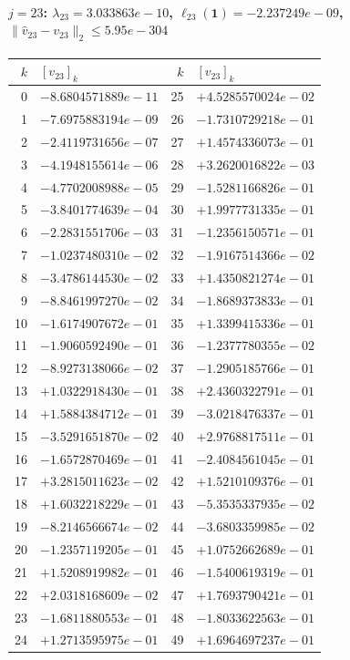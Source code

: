 \paragraph{$j = 23$: $\lambda_{23} = 3.033863e-10$, \quad $\ell_{23}(\mathbf{1}) = -2.237249e-09$, \quad $\|\hat{v}_{23} - v_{23}\|_2 \leq 5.95e-304$}
\begin{center}
{\footnotesize
\begin{tabular}{r@{\;\;}l@{\quad}r@{\;\;}l}
\toprule
$k$ & $[v_{23}]_k$ & $k$ & $[v_{23}]_k$ \\
\midrule
0 & $-8.6804571889e-11$ & 25 & $+4.5285570024e-02$ \\
1 & $-7.6975883194e-09$ & 26 & $-1.7310729218e-01$ \\
2 & $-2.4119731656e-07$ & 27 & $+1.4574336073e-01$ \\
3 & $-4.1948155614e-06$ & 28 & $+3.2620016822e-03$ \\
4 & $-4.7702008988e-05$ & 29 & $-1.5281166826e-01$ \\
5 & $-3.8401774639e-04$ & 30 & $+1.9977731335e-01$ \\
6 & $-2.2831551706e-03$ & 31 & $-1.2356150571e-01$ \\
7 & $-1.0237480310e-02$ & 32 & $-1.9167514366e-02$ \\
8 & $-3.4786144530e-02$ & 33 & $+1.4350821274e-01$ \\
9 & $-8.8461997270e-02$ & 34 & $-1.8689373833e-01$ \\
10 & $-1.6174907672e-01$ & 35 & $+1.3399415336e-01$ \\
11 & $-1.9060592490e-01$ & 36 & $-1.2377780355e-02$ \\
12 & $-8.9273138066e-02$ & 37 & $-1.2905185766e-01$ \\
13 & $+1.0322918430e-01$ & 38 & $+2.4360322791e-01$ \\
14 & $+1.5884384712e-01$ & 39 & $-3.0218476337e-01$ \\
15 & $-3.5291651870e-02$ & 40 & $+2.9768817511e-01$ \\
16 & $-1.6572870469e-01$ & 41 & $-2.4084561045e-01$ \\
17 & $+3.2815011623e-02$ & 42 & $+1.5210109376e-01$ \\
18 & $+1.6032218229e-01$ & 43 & $-5.3535337935e-02$ \\
19 & $-8.2146566674e-02$ & 44 & $-3.6803359985e-02$ \\
20 & $-1.2357119205e-01$ & 45 & $+1.0752662689e-01$ \\
21 & $+1.5208919982e-01$ & 46 & $-1.5400619319e-01$ \\
22 & $+2.0318168609e-02$ & 47 & $+1.7693790421e-01$ \\
23 & $-1.6811880553e-01$ & 48 & $-1.8033622563e-01$ \\
24 & $+1.2713595975e-01$ & 49 & $+1.6964697237e-01$ \\
\bottomrule
\end{tabular}
}
\end{center}

